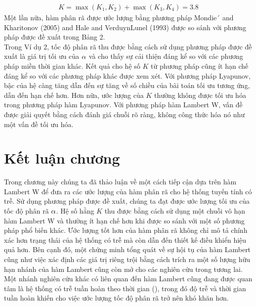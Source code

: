 \begin{vd}
\begin{align*}
	K = \max(K_1, K_2) + \max(K_3, K_4) = 3.8
\end{align*}
Một lần nữa, hàm phân rã được ước lượng bằng phương pháp Mondie´ and Kharitonov (2005) and Hale and VerduynLunel (1993) được so sánh với phương pháp được đề xuất trong Bảng 2.\\
Trong Ví dụ 2, tốc độ phân rã thu được bằng cách sử dụng phương pháp được đề xuất là giá trị tối ưu của $\alpha$ và cho thấy sự cải thiện đáng kể so với các phương pháp miền thời gian khác.
Kết quả cho hệ số $K$ từ phương pháp cũng ít hạn chế đáng kể so với các phương pháp khác được xem xét. Với phương pháp Lyapunov,  bậc của hệ càng tăng dẫn đến sự tăng về số chiều của bài toán tối ưu tương ứng, dẫn đến hạn chế hơn. Hơn nữa, ước lượng của $K$ thường không được tối ưu hóa trong phương pháp hàm Lyapunov. Với phương pháp hàm Lambert W, vấn đề được giải quyết bằng cách đánh giá chuỗi rõ ràng, không công thức hóa nó như một vấn đề tối ưu hóa.
\end{vd}


\section{Kết luận chương}
Trong chương này chúng ta đã thảo luận về một cách tiếp cận dựa trên hàm Lambert W để đưa ra các ước lượng của hàm phân rã cho hệ thống tuyến tính có trễ. 
Sử dụng phương pháp được đề xuất, chúng ta đạt được ước lượng tối ưu của tốc độ phân rã $\alpha$. Hệ số hằng $K$ thu được bằng cách sử dụng một chuỗi vô hạn hàm Lambert W và thường ít hạn chế hơn khi được so sánh với một số phương pháp phổ biến khác. Ước lượng tốt hơn của hàm phân rã không chỉ mô tả chính xác hơn trạng thái của hệ thống có trễ mà còn dẫn đến thiết kế điều khiển hiệu quả hơn. Bên cạnh đó, một chứng minh tổng quát 
về sự hội tụ của hàm Lambert cũng như việc xác định các giá trị riêng trội bằng cách trích ra một số lượng hữu hạn nhánh của hàm Lambert cũng còn mở cho các nghiên cứu trong tương lai. 
Một nhánh nghiên cứu khác có liên quan đến hàm Lambert cũng đang được quan tâm là hệ thống có trễ tuần hoàn theo thời gian (\cite{Ins02, Ins10}), trong đó độ trễ và thời gian tuần hoàn khiến cho việc ước lượng tốc độ phân rã trở nên khó khăn hơn. 






